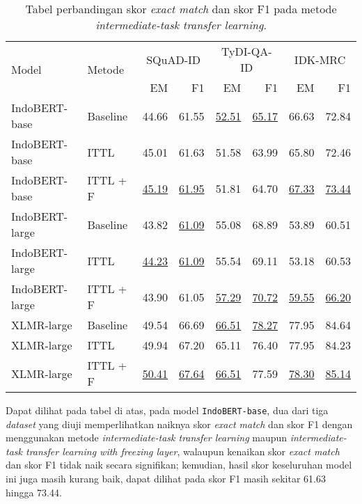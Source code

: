 \begin{table}[H]\centering
\begin{tabular}{llrrrrrr}
\toprule
         \multirow{2}{*}{Model} &\multirow{2}{*}{Metode} &\multicolumn{2}{c}{SQuAD-ID} &\multicolumn{2}{c}{TyDI-QA-ID} &\multicolumn{2}{c}{IDK-MRC} \\\cmidrule{3-8}
& &EM &F1 &EM &F1 &EM &F1
\\\midrule
 IndoBERT-base & Baseline & 44.66 & 61.55 & \underline{52.51} & \underline{65.17} & 66.63 & 72.84 \\
 IndoBERT-base &     ITTL & 45.01 & 61.63 & 51.58 & 63.99 & 65.80 & 72.46 \\
 IndoBERT-base & ITTL + F & \underline{45.19} & \underline{61.95} & 51.81 & 64.70 & \underline{67.33} & \underline{73.44} \\
 \hline
IndoBERT-large & Baseline & 43.82 & \underline{61.09} & 55.08 & 68.89 & 53.89 & 60.51 \\
IndoBERT-large &     ITTL & \underline{44.23} & \underline{61.09} & 55.54 & 69.11 & 53.18 & 60.53 \\
IndoBERT-large & ITTL + F & 43.90 & 61.05 & \underline{57.29} & \underline{70.72} & \underline{59.55} & \underline{66.20} \\
\hline
    XLMR-large & Baseline & 49.54 & 66.69 & \underline{66.51} & \underline{78.27} & 77.95 & 84.64 \\
    XLMR-large &     ITTL & 49.94 & 67.20 & 65.11 & 76.40 & 77.95 & 84.23 \\
    XLMR-large & ITTL + F & \underline{50.41} & \underline{67.64} & \underline{66.51} & 77.59 & \underline{78.30} & \underline{85.14} \\
\bottomrule
\end{tabular}
\caption{Tabel perbandingan skor \emph{exact match} dan skor F1 pada metode \emph{intermediate-task transfer learning}.}
\end{table}

Dapat dilihat pada tabel di atas, pada model \texttt{IndoBERT-base}, dua dari tiga \emph{dataset} yang diuji memperlihatkan naiknya skor \emph{exact match} dan skor F1 dengan menggunakan metode \emph{intermediate-task transfer learning} maupun \emph{intermediate-task transfer learning with freezing layer}, walaupun kenaikan skor \emph{exact match} dan skor F1 tidak naik secara signifikan; kemudian, hasil skor keseluruhan model ini juga masih kurang baik, dapat dilihat pada skor F1 masih sekitar 61.63 hingga 73.44.

